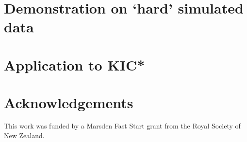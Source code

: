 \documentclass[a4paper,fleqn,usenatbib]{mnras}
\begin{document}
\section{Demonstration on `hard' simulated data}

\section{Application to KIC*}


\section*{Acknowledgements}
This work was funded by a Marsden Fast Start grant from the Royal Society of
New Zealand.












\bsp	%
\label{lastpage}
\end{document}
